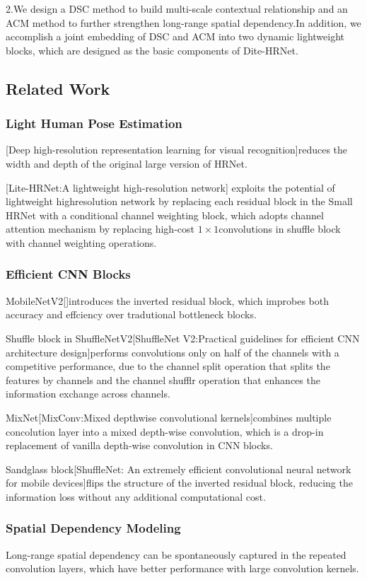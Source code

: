 \documentclass[11pt]{article}
\begin{document}
2.We design a DSC method to build multi-scale contextual relationship and an ACM method to further strengthen long-range spatial dependency.In addition, we accomplish a joint embedding of DSC and ACM into two dynamic lightweight blocks, which are designed as the basic components of Dite-HRNet.

\subsection{Related Work}
\subsubsection{Light Human Pose Estimation}
[Deep high-resolution representation learning for visual recognition]reduces the width and depth of the original large version of HRNet.

[Lite-HRNet:A lightweight high-resolution network] exploits the potential of lightweight highresolution network by replacing each residual block in the Small HRNet with a conditional channel weighting block, which adopts channel attention mechanism by replacing high-cost $1\times 1$convolutions in shuffle block with channel weighting operations.
\subsubsection{Efficient CNN Blocks}
MobileNetV2[\qquad]introduces the inverted residual block, which improbes both accuracy and effciency over tradutional bottleneck blocks.

Shuffle block in ShuffleNetV2[ShuffleNet V2:Practical guidelines for efficient CNN architecture design]performs convolutions only on half of the channels with a competitive performance, due to the channel split operation that splits the features by channels and the channel shufflr operation that enhances the information exchange across channels.

MixNet[MixConv:Mixed depthwise convolutional kernels]combines multiple concolution layer into a mixed depth-wise convolution, which is a drop-in replacement of vanilla depth-wise convolution in CNN blocks.

Sandglass block[ShuffleNet: An extremely efficient convolutional neural network for mobile devices]flips the structure of the inverted residual block, reducing the information loss without any additional computational cost.
\subsubsection{Spatial Dependency Modeling}
Long-range spatial dependency can be spontaneously captured in the repeated convolution layers, which have better performance with large convolution kernels.
\end{document}
